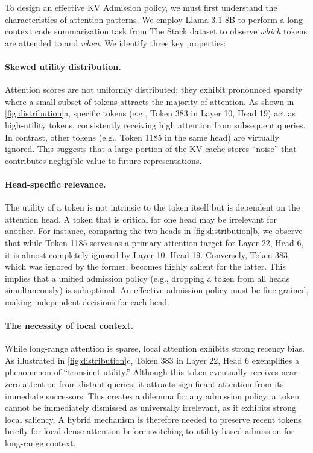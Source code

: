 To design an effective KV Admission policy, we must first understand the characteristics of attention patterns. We employ Llama-3.1-8B \cite{llama3} to perform a long-context code summarization task from The Stack dataset \cite{thestack} to observe \textit{which} tokens are attended to and \textit{when}. We identify three key properties:


\paragraph{Skewed utility distribution.}
Attention scores are not uniformly distributed; they exhibit pronounced sparsity where a small subset of tokens attracts the majority of attention. As shown in \cref{fig:distribution}a, specific tokens (e.g., Token 383 in Layer 10, Head 19) act as high-utility tokens, consistently receiving high attention from subsequent queries. In contrast, other tokens (e.g., Token 1185 in the same head) are virtually ignored. This suggests that a large portion of the KV cache stores ``noise'' that contributes negligible value to future representations.

\paragraph{Head-specific relevance.}
The utility of a token is not intrinsic to the token itself but is dependent on the attention head. A token that is critical for one head may be irrelevant for another. For instance, comparing the two heads in \cref{fig:distribution}b, we observe that while Token 1185 serves as a primary attention target for Layer 22, Head 6, it is almost completely ignored by Layer 10, Head 19. Conversely, Token 383, which was ignored by the former, becomes highly salient for the latter. This implies that a unified admission policy (e.g., dropping a token from all heads simultaneously) is suboptimal. An effective admission policy must be fine-grained, making independent decisions for each head.

\paragraph{The necessity of local context.} While long-range attention is sparse, local attention exhibits strong recency bias. As illustrated in \cref{fig:distribution}c, Token 383 in Layer 22, Head 6 exemplifies a phenomenon of ``transient utility.'' Although this token eventually receives near-zero attention from distant queries, it attracts significant attention from its immediate successors. This creates a dilemma for any admission policy: a token cannot be immediately dismissed as universally irrelevant, as it exhibits strong local saliency. A hybrid mechanism is therefore needed to preserve recent tokens briefly for local dense attention before switching to utility-based admission for long-range context.

